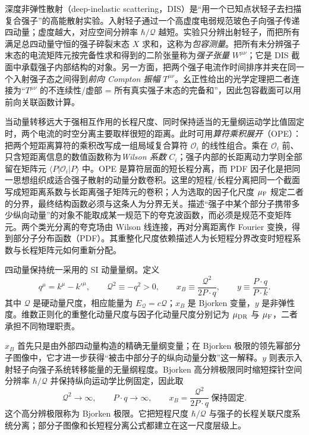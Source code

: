 
深度非弹性散射（deep-inelastic scattering，DIS）是“用一个已知点状轻子去扫描复合强子”的高能散射实验。入射轻子通过一个高虚度电弱规范玻色子向强子传递四动量；虚度越大，对应空间分辨率 $\hbar/\mathcal Q$ 越短。实验只分辨出射轻子，而把所有满足总四动量守恒的强子碎裂末态 $X$ 求和，这称为\emph{包容测量}。把所有未分辨强子末态的电流矩阵元按完备性求和得到的二阶张量称为\emph{强子张量} $W^{\mu\nu}$；它是 DIS 截面中承载强子内部结构的对象。另一方面，把两个强子电流作时间排序并夹在同一个入射强子态之间得到\emph{前向 Compton 振幅} $T^{\mu\nu}$。幺正性给出的光学定理把二者连接为“$T^{\mu\nu}$ 的不连续性/虚部 = 所有真实强子末态的完备和”，因此包容截面可以用前向关联函数计算。

当动量转移远大于强相互作用的长程尺度、同时保持适当的无量纲运动学比值固定时，两个电流的时空分离主要取样很短的距离。此时可用\emph{算符乘积展开}（OPE）：把两个短距离算符的乘积改写成一组局域复合算符 $\mathcal O_i$ 的线性组合。乘在 $\mathcal O_i$ 前、只含短距离信息的数值函数称为\emph{Wilson 系数} $C_i$；强子内部的长距离动力学则全部留在矩阵元 $\langle P|\mathcal O_i|P\rangle$ 中。OPE 是算符层面的短长程分离，而 PDF 因子化是把同一思想组织成适合强子散射的动量分数卷积。这里的短程/长程分离把同一个截面写成短距离系数与长距离强子矩阵元的卷积；人为选取的因子化尺度 $\mu_{\rm F}$ 规定二者的分界，最终结构函数必须与这条人为分界无关。描述“强子中某个部分子携带多少纵向动量”的对象不能取成某一规范下的夸克波函数，而必须是规范不变矩阵元。两个类光分离的夸克场由 Wilson 线连接，再对分离距离作 Fourier 变换，得到部分子分布函数（PDF）。其重整化尺度依赖描述人为长短程分界改变时短程系数与长程矩阵元如何重新分配。

四动量保持统一采用的 SI 动量量纲。定义
\begin{equation}
 {
 q^\mu=k^\mu-k'^\mu,
 \qquad
 \mathcal Q^2\equiv-q^2>0,
 \qquad
 x_B\equiv\frac{\mathcal Q^2}{2P\cdot q},
 \qquad
 y\equiv\frac{P\cdot q}{P\cdot k}.}
 \label{eq:dis-kinematic-invariants-dp68}
\end{equation}
其中 $\mathcal Q$ 是硬动量尺度，相应能量为 $E_{\mathcal Q}=c\mathcal Q$；$x_B$ 是 Bjorken 变量，$y$ 是非弹性度。维数正则化的重整化动量尺度与因子化动量尺度分别记为 $\mu_{\rm DR}$ 与 $\mu_{\rm F}$，二者承担不同物理职责。

$x_B$ 首先只是由外部四动量构造的精确无量纲变量；在 Bjorken 极限的领先幂部分子图像中，它才进一步获得“被击中部分子的纵向动量分数”这一解释。$y$ 则表示入射轻子向强子系统转移能量的无量纲程度。Bjorken 高分辨极限同时缩短探针空间分辨率 $\hbar/\mathcal Q$ 并保持纵向运动学比例固定，因此取
\begin{equation}
 {
 \mathcal Q^2\to\infty,
 \qquad P\cdot q\to\infty,
 \qquad x_B=\frac{\mathcal Q^2}{2P\cdot q}\ \text{保持固定}.}
 \label{eq:dis-bjorken-limit-dp76}
\end{equation}
这个高分辨极限称为 Bjorken 极限。它把短程尺度 $\hbar/\mathcal Q$ 与强子的长程关联尺度系统分离；部分子图像和长短程分离公式都建立在这一尺度层级上。

